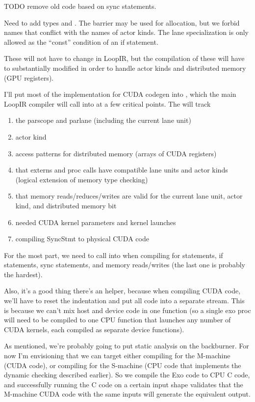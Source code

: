 TODO remove old code based on  sync statements.

\filbreak
{} Need to add types  and .
The barrier may be used for allocation, but we forbid names that conflict with the names of actor kinds.
The lane specialization is only allowed as the ``const'' condition of an if statement.

\filbreak
{} These will not have to change in LoopIR, but the compilation of these will have to substantially modified in order to handle actor kinds and distributed memory (GPU registers).

\filbreak
{}

I'll put most of the implementation for CUDA codegen into , which the main LoopIR compiler will call into at a few critical points.
The  will track
\begin{enumerate}
  \item the parscope and parlane (including the current lane unit)
  \item actor kind
  \item access patterns for distributed memory (arrays of CUDA registers)
  \item that externs and proc calls have compatible lane units and actor kinds (logical extension of memory type checking)
  \item that memory reads/reduces/writes are valid for the current lane unit, actor kind, and distributed memory bit
  \item needed CUDA kernel parameters and kernel launches
  \item compiling SyncStmt to physical CUDA code
\end{enumerate}

\filbreak
For the most part, we need to call into  when compiling for statements, if statements, sync statements, and memory reads/writes (the last one is probably the hardest).

\filbreak
Also, it's a good thing there's an  helper, because when compiling CUDA code, we'll have to reset the indentation and put all code into a separate stream.
This is because we can't mix host and device code in one function (so a single exo proc will need to be compiled to one CPU function that launches any number of CUDA kernels, each compiled as separate device functions).

\filbreak
{}

As mentioned, we're probably going to put static analysis on the backburner.
For now I'm envisioning that we can target either compiling for the M-machine (CUDA code), or compiling for the S-machine (CPU code that implements the dynamic checking described earlier).
So we compile the Exo code to CPU C code, and successfully running the C code on a certain input shape validates that the M-machine CUDA code with the same inputs will generate the equivalent output.


